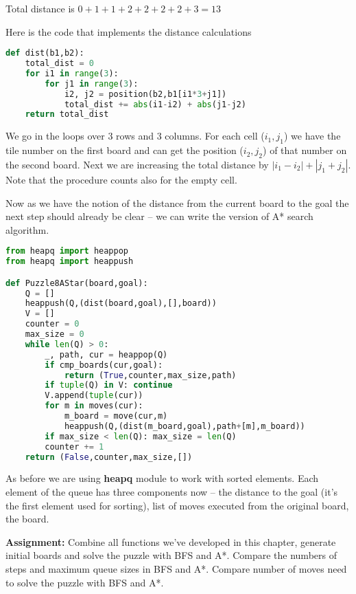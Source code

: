 Total distance is $0+1+1+2+2+2+2+3=13$

Here is the code that implements the distance calculations

\begin{lstlisting}[language=Python,style=codelst2,caption={Python: 8-puzzle, distance between boards}]
def dist(b1,b2):
    total_dist = 0
    for i1 in range(3):
        for j1 in range(3):
            i2, j2 = position(b2,b1[i1*3+j1])
            total_dist += abs(i1-i2) + abs(j1-j2)
    return total_dist
\end{lstlisting}
We go in the loops over 3 rows and 3 columns.
For each cell ($i_1,j_1$) we have the tile number 
on the first board and can get the position ($i_2,j_2$) of that number on
the second board. Next we are increasing the total distance
by $|i_1-i_2|+|j_1+j_2|$. Note that the procedure counts also
for the empty cell.

Now as we have the notion of the distance from the current board
to the goal the next step should already be clear -- 
we can write the version of A* search algorithm.

\newpage

\begin{lstlisting}[language=Python,style=codelst2,caption={Python: 8-puzzle, A*}]
from heapq import heappop
from heapq import heappush

def Puzzle8AStar(board,goal):
    Q = []
    heappush(Q,(dist(board,goal),[],board))
    V = []
    counter = 0
    max_size = 0
    while len(Q) > 0:
        _, path, cur = heappop(Q)
        if cmp_boards(cur,goal): 
            return (True,counter,max_size,path)
        if tuple(Q) in V: continue
        V.append(tuple(cur))
        for m in moves(cur):
            m_board = move(cur,m)
            heappush(Q,(dist(m_board,goal),path+[m],m_board))
        if max_size < len(Q): max_size = len(Q)
        counter += 1
    return (False,counter,max_size,[])
\end{lstlisting}
As before we are using \textbf{heapq} module to work with
sorted elements. Each element of the queue has three
components now -- the distance to the goal (it's the first
element used for sorting), list of moves
executed from the original board, the board.

\begin{tcolorbox}
\textbf{Assignment:}
Combine all functions we've developed in this chapter,
generate initial boards and solve the puzzle with
BFS and A*. Compare the numbers of steps and maximum 
queue sizes in BFS and A*. Compare number of moves need to
solve the puzzle with BFS and A*.
\end{tcolorbox}


